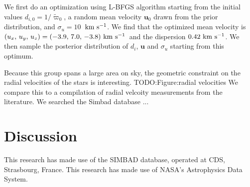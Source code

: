 \documentclass[modern,letterpaper]{aastex61}
\newcommand{\bs}[1]{\boldsymbol{#1}}
\renewcommand{\vec}[1]{\bs{#1}}
\newcommand{\kms}{\ensuremath{\rm km~s^{-1}}}
\newcommand{\todo}[1]{{\color{crimson}TODO:#1}}
\newcommand{\meanVelocityOpt}{\ensuremath{(u_x,\,u_y,\,u_z) = (-3.9,\,7.0,\,-3.8)~\kms}}
\newcommand{\sigVelocityOpt}{\ensuremath{0.42~\kms}}
\begin{document}
We first do an optimization using L-BFGS algorithm starting from the
initial values $d_{i,0} = 1/{\tilde \varpi_0}$, a random mean velocity $\vec{u}_0$
drawn from the prior distribution, and $\sigma_u=10$~\kms.
We find that the optimized mean velocity is \meanVelocityOpt\ and the dispersion \sigVelocityOpt.
We then sample the posterior distribution of $d_i$, $\vec{u}$ and $\sigma_u$ starting
from this optimum.


Because this group spans a large area on sky,
the geometric constraint on the radial velocities of the stars is interesting.
\todo{Figure:radial velocities}
We compare this to a compilation of radial velcoity measurements from the literature.
We searched the Simbad database ...



\section{Discussion}
\label{sec:discussion}

% 



\acknowledgements
This research has made use of the SIMBAD database,
operated at CDS, Strasbourg, France.
This research has made use of NASA's Astrophysics Data System.



\end{document}
